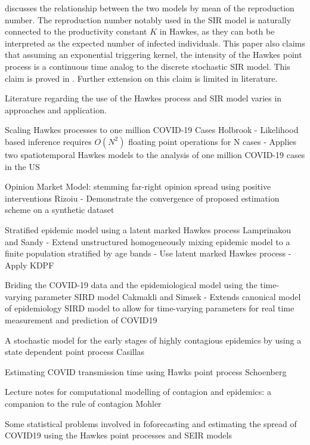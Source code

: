 \documentclass[12pt]{article}
\begin{document}
\cite{Kresin2022} discusses the relationship between the two models by mean of the reproduction number. The reproduction number notably used in the SIR model is naturally connected to the productivity constant $K$ in Hawkes, as they can both be interpreted as the expected number of infected individuals. This paper also claims that assuming an exponential triggering kernel, the intensity of the Hawkes point process is a continuous time analog to the discrete stochastic SIR model. This claim is proved in \cite{Rizoiu2018}. Further extension on this claim is limited in literature. 

Literature regarding the use of the Hawkes process and SIR model varies in approaches and application. 










Scaling Hawkes processes to one million COVID-19 Cases
Holbrook
- Likelihood based inference requires $O(N^2)$ floating point operations for N cases
- Applies two spatiotemporal Hawkes models to the analysis of one million COVID-19 cases in the US


Opinion Market Model: stemming far-right opinion spread using positive interventions
Rizoiu
- Demonstrate the convergence of proposed estimation scheme on a synthetic dataset


Stratified epidemic model using a latent marked Hawkes process
Lamprinakou and Sandy
- Extend unstructured homogeneously mixing epidemic model to a finite population stratified by age bands
- Use latent marked Hawkes process
- Apply KDPF

Briding the COVID-19 data and the epidemiological model using the time-varying parameter SIRD model
Cakmakli and Simsek
- Extends canonical model of epidemiology SIRD model to allow for time-varying parameters for real time measurement and prediction of COVID19


A stochastic model for the early stages of highly contagious epidemics by using a state dependent point process
Casillas


Estimating COVID transmission time using Hawks point process
Schoenberg


Lecture notes for computational modelling of contagion and epidemics: a companion to the rule of contagion 
Mohler


Some statistical problems involved in foforecasting and estimating the spread of COVID19 using the Hawkes point processes and SEIR models
\end{document}
